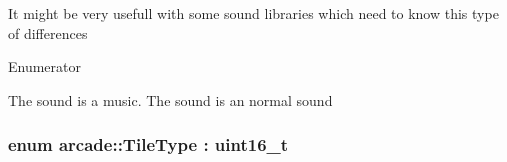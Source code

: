 It might be very usefull with some sound libraries which need to know this type of differences \begin{Desc}
\item[Enumerator]\par
\begin{description}
\item[{\em 
\hypertarget{namespacearcade_a3bb4743a2eea59f3927e404e6549cae5a5a4967c8f21ad70ba0e0459a0add50f0}{M\-U\-S\-I\-C}\label{namespacearcade_a3bb4743a2eea59f3927e404e6549cae5a5a4967c8f21ad70ba0e0459a0add50f0}
}]\item[{\em 
\hypertarget{namespacearcade_a3bb4743a2eea59f3927e404e6549cae5a37f1d8b7897a8b789c2dd953b53416ef}{S\-O\-U\-N\-D}\label{namespacearcade_a3bb4743a2eea59f3927e404e6549cae5a37f1d8b7897a8b789c2dd953b53416ef}
}]The sound is a music. The sound is an normal sound \end{description}
\end{Desc}
\hypertarget{namespacearcade_a61ba576694ea309cdf2b4b66902408ca}{
\subsubsection[{Tile\-Type}]{\setlength{\rightskip}{0pt plus 5cm}enum {\bf arcade\-::\-Tile\-Type} \-: uint16\-\_\-t\hspace{0.3cm}{\ttfamily [strong]}}}\label{namespacearcade_a61ba576694ea309cdf2b4b66902408ca}
